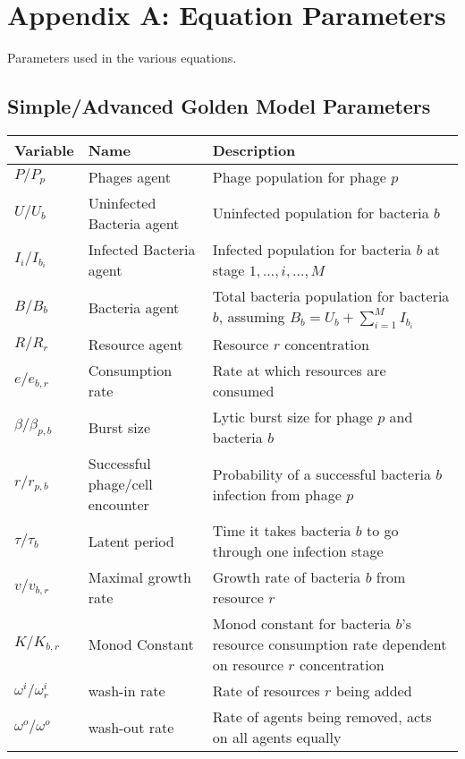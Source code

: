 \chapter{Appendix A: Equation Parameters}
\label{AppendixA}
Parameters used in the various equations. 

\section{Simple/Advanced Golden Model Parameters}
\begin{table}[H]
    \small %
    \centering
    \begin{tabularx}{\textwidth}{l l X}
        \toprule
        \textbf{Variable} & \textbf{Name} & \textbf{Description} \\
        \midrule
        $P / P_p$ & Phages agent & Phage population for phage $p$ \\
        $U / U_b$ & Uninfected Bacteria agent & Uninfected population for bacteria $b$ \\
        $I_i / I_{b_i}$ & Infected Bacteria agent & Infected population for bacteria $b$ at stage $1, \dots, i, \dots, M$ \\
        $B / B_b$ & Bacteria agent & Total bacteria population for bacteria $b$, assuming $B_b = U_b + \sum_{i=1}^M I_{b_i}$ \\
        $R / R_r$ & Resource agent & Resource $r$ concentration\\
        $e / e_{b, r}$ & Consumption rate& Rate at which resources are consumed\\
        $\beta / \beta_{p, b}$ & Burst size & Lytic burst size for phage $p$ and bacteria $b$\\
        $r / r_{p, b}$ & Successful phage/cell encounter & Probability of a successful bacteria $b$ infection from phage $p$\\
        $\tau / \tau_{b}$ & Latent period & Time it takes bacteria $b$ to go through one infection stage\\
        $v / v_{b, r}$ & Maximal growth rate & Growth rate of bacteria $b$ from resource $r$ \\
        $K / K_{b, r}$ & Monod Constant & Monod constant for bacteria $b$'s resource consumption rate dependent on resource $r$ concentration\\
        $\omega^i / \omega^i_r$ & wash-in rate & Rate of resources $r$ being added\\
        $\omega^o / \omega^o$ & wash-out rate & Rate of agents being removed, acts on all agents equally\\

\end{tabularx}
\end{table}
